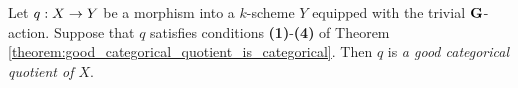 \begin{definition}
Let $q:X\rightarrow Y$ be a morphism into a $k$-scheme $Y$ equipped with the trivial $\mathbf{G}$-action. Suppose that $q$ satisfies conditions \textbf{(1)}-\textbf{(4)} of Theorem \ref{theorem:good_categorical_quotient_is_categorical}. Then $q$ is \textit{a good categorical quotient of $X$}.
\end{definition}

\begin{proposition}
\end{proposition}




\small



    

